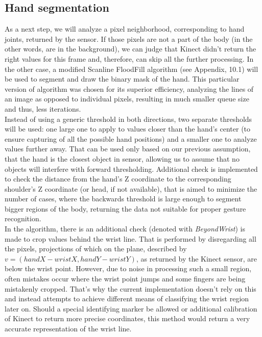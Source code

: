 \documentclass[a4paper,11pt,oneside]{article}
\begin{document}
  \subsection{Hand segmentation}
  
As a next step, we will analyze a pixel neighborhood, corresponding to hand joints, returned by the sensor. If those pixels are not a part of the body (in the other words, are in the background), we can judge that Kinect didn't return the right values for this frame and, therefore, can skip all the further processing. In the other case, a modified Scanline FloodFill algorithm (see Appendix, 10.1) will be used to segment and draw the binary mask of the hand. This particular version of algorithm was chosen for its superior efficiency, analyzing the lines of an image as opposed to individual pixels, resulting in much smaller queue size and thus, less iterations.\\

Instead of using a generic threshold in both directions, two separate thresholds will be used: one large one to apply to values closer than the hand's center (to ensure capturing of all the possible hand positions) and a smaller one to analyze values further away. That can be used only based on our previous assumption, that the hand is the closest object in sensor, allowing us to assume that no objects will interfere with forward thresholding. Additional check is implemented to check the distance from the hand's Z coordinate to the corresponding shoulder's Z coordinate (or head, if not available), that is aimed to minimize the number of cases, where the backwards threshold is large enough to segment bigger regions of the body, returning the data not suitable for proper gesture recognition.\\

In the algorithm, there is an additional check (denoted with \textit{BeyondWrist}) is made to crop values behind the wrist line. That is performed by disregarding all the pixels, projections of which on the plane, described by $v = (handX - wristX, handY - wristY)$, as returned by the Kinect sensor, are below the wrist point. However, due to noise in processing such a small region, often mistakes occur where the wrist point jumps and some fingers are being mistakenly cropped. That's why the current implementation doesn't rely on this and instead attempts to achieve different means of classifying the wrist region later on. Should a special identifying marker be allowed or additional calibration of Kinect  to return more precise coordinates, this method would return a very accurate representation of the wrist line.\\
\end{document}
